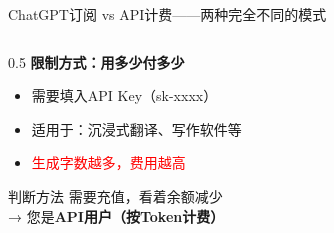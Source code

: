 \documentclass[aspectratio=169,11pt]{beamer}
\begin{document}
\begin{frame}{ChatGPT订阅 vs API计费——两种完全不同的模式}
\begin{columns}
\begin{column}{0.5\textwidth}
            \textbf{限制方式：用多少付多少}
            \begin{itemize}
                \item 需要填入API Key（sk-xxxx）
                \item 适用于：沉浸式翻译、写作软件等
                \item \textcolor{red}{生成字数越多，费用越高}
            \end{itemize}
            
            \vspace{0.2cm}
            \begin{alertblock}{判断方法}
                \small
                需要充值，看着余额减少\\
                → 您是\textbf{API用户（按Token计费）}
            \end{alertblock}
        \end{column}
    \end{columns}
\end{frame}
\end{document}

